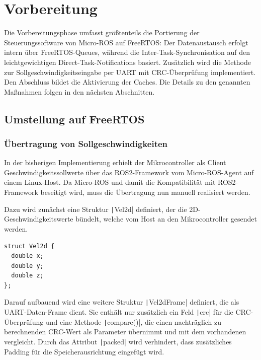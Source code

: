\section{Vorbereitung}

Die Vorbereitungsphase umfasst größtenteils die Portierung der
Steuerungssoftware von Micro-ROS auf FreeRTOS: Der Datenaustausch erfolgt intern
über FreeRTOS-Queues, während die Inter-Task-Synchronisation auf den
leichtgewichtigen Direct-Task-Notifications basiert. Zusätzlich wird die Methode
zur Sollgeschwindigkeitseingabe per UART mit CRC-Überprüfung implementiert. Den
Abschluss bildet die Aktivierung der Caches. Die Details zu den genannten
Maßnahmen folgen in den nächsten Abschnitten.

\subsection{Umstellung auf FreeRTOS}

\subsubsection{Übertragung von Sollgeschwindigkeiten}

In der bisherigen Implementierung erhielt der Mikrocontroller als Client
Geschwindigkeitssollwerte über das ROS2-Framework vom Micro-ROS-Agent auf einem
Linux-Host. Da Micro-ROS und damit die Kompatibilität mit ROS2-Framework
beseitigt wird, muss die Übertragung nun manuell realisiert werden.

Dazu wird zunächst eine Struktur \texttt|Vel2d| definiert, der die
2D-Geschwindigkeitswerte bündelt, welche vom Host an den Mikrocontroller
gesendet werden.

\begin{code}
\begin{verbatim}
struct Vel2d {
  double x;
  double y;
  double z;
};
\end{verbatim}
\end{code}

Darauf aufbauend wird eine weitere Struktur \texttt|Vel2dFrame|
definiert, die als UART-Daten-Frame dient. Sie enthält nur zusätzlich ein Feld
\texttt|crc| für die CRC-Überprüfung und eine Methode
\texttt|compare()|, die einen nachträglich zu berechnenden CRC-Wert als
Parameter übernimmt und mit dem vorhandenen vergleicht. Durch das Attribut
\texttt|packed| wird verhindert, dass zusätzliches Padding für die
Speicherausrichtung eingefügt wird.

